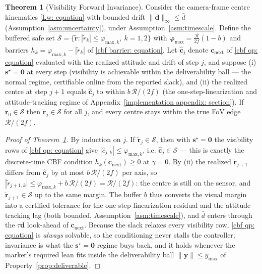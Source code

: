 \documentclass{IEEEtaes}
\theoremstyle{definition}
\newtheorem{theorem}{Theorem}
\theoremstyle{remark}
\begin{document}
\begin{theorem}[Visibility Forward Invariance]\label{thm:visibility}
Consider the camera-frame centre kinematics \eqref{Lw: equation} with bounded drift $\|\boldsymbol{d}\|_\infty\le\bar{d}$ (Assumption~\ref{asm:uncertainty}), under Assumption~\ref{asm:timescale}. Define the buffered safe set $\mathcal{S}=\{\tilde{\boldsymbol{r}}:|\tilde{r}_{k}|\le\varphi_{\text{max},k},\ k=1,2\}$ with $\boldsymbol{\varphi}_\text{max}=\tfrac{\mathcal{R}}{2f}(1-b)$ and barriers $h_k=\varphi_{\text{max},k}-|\tilde{r}_k|$ of \eqref{cbf barrier: equation}. Let $\hat{\boldsymbol{c}}_j$ denote $\boldsymbol{c}_\text{next}$ of \eqref{cbf qp: equation} evaluated with the realized attitude and drift of step $j$, and suppose (i) $\boldsymbol{s}^\star=\boldsymbol{0}$ at every step (visibility is achievable within the deliverability ball --- the normal regime, certifiable online from the reported slack), and (ii) the realized centre at step $j{+}1$ equals $\hat{\boldsymbol{c}}_j$ to within $b\,\mathcal{R}/(2f)$ (the one-step-linearization and attitude-tracking regime of Appendix~\ref{implementation appendix: section}). If $\tilde{\boldsymbol{r}}_0\in\mathcal{S}$ then $\tilde{\boldsymbol{r}}_j\in\mathcal{S}$ for all $j$, and every centre stays within the true FoV edge $\mathcal{R}/(2f)$.
\end{theorem}

\begin{proof}[Proof of Theorem~\ref{thm:visibility}] By induction on $j$. If $\tilde{\boldsymbol{r}}_j\in\mathcal{S}$, then with $\boldsymbol{s}^\star=\boldsymbol{0}$ the visibility rows of \eqref{cbf qp: equation} give $|\hat{c}_{j,k}|\le\varphi_{\text{max},k}$, i.e. $\hat{\boldsymbol{c}}_j\in\mathcal{S}$ --- this is exactly the discrete-time CBF condition $h_k(\boldsymbol{c}_\text{next})\ge0$ at $\gamma=0$. By (ii) the realized $\tilde{\boldsymbol{r}}_{j+1}$ differs from $\hat{\boldsymbol{c}}_j$ by at most $b\,\mathcal{R}/(2f)$ per axis, so $|\tilde r_{j+1,k}|\le\varphi_{\text{max},k}+b\,\mathcal{R}/(2f)=\mathcal{R}/(2f)$: the centre is still on the sensor, and $\tilde{\boldsymbol{r}}_{j+1}\in\mathcal{S}$ up to the same margin. The buffer $b$ thus converts the visual margin into a certified tolerance for the one-step linearization residual and the attitude-tracking lag (both bounded, Assumption~\ref{asm:timescale}), and $\bar d$ enters through the $\tau\boldsymbol{d}$ look-ahead of $\boldsymbol{c}_\text{next}$. Because the slack relaxes every visibility row, \eqref{cbf qp: equation} is \emph{always} solvable, so the conditioning never stalls the controller; invariance is what the $\boldsymbol{s}^\star=\boldsymbol{0}$ regime buys back, and it holds whenever the marker's required lean fits inside the deliverability ball $\|\boldsymbol{y}\|\le y_\text{max}$ of Property~\ref{prop:deliverable}. \end{proof}
\end{document}
